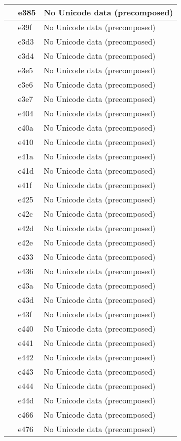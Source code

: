 \documentclass[12pt,letterpaper,openany]{book}
\begin{document}
\begin{center}
\begin{supertabular}{|m{0.25in}|m{0.5in}|m{4in}|}
 & e385 & No Unicode data (precomposed)\\\hline
 & e39f & No Unicode data (precomposed)\\\hline
 & e3d3 & No Unicode data (precomposed)\\\hline
 & e3d4 & No Unicode data (precomposed)\\\hline
 & e3e5 & No Unicode data (precomposed)\\\hline
 & e3e6 & No Unicode data (precomposed)\\\hline
 & e3e7 & No Unicode data (precomposed)\\\hline
 & e404 & No Unicode data (precomposed)\\\hline
 & e40a & No Unicode data (precomposed)\\\hline
 & e410 & No Unicode data (precomposed)\\\hline
 & e41a & No Unicode data (precomposed)\\\hline
 & e41d & No Unicode data (precomposed)\\\hline
 & e41f & No Unicode data (precomposed)\\\hline
 & e425 & No Unicode data (precomposed)\\\hline
 & e42c & No Unicode data (precomposed)\\\hline
 & e42d & No Unicode data (precomposed)\\\hline
 & e42e & No Unicode data (precomposed)\\\hline
 & e433 & No Unicode data (precomposed)\\\hline
 & e436 & No Unicode data (precomposed)\\\hline
 & e43a & No Unicode data (precomposed)\\\hline
 & e43d & No Unicode data (precomposed)\\\hline
 & e43f & No Unicode data (precomposed)\\\hline
 & e440 & No Unicode data (precomposed)\\\hline
 & e441 & No Unicode data (precomposed)\\\hline
 & e442 & No Unicode data (precomposed)\\\hline
 & e443 & No Unicode data (precomposed)\\\hline
 & e444 & No Unicode data (precomposed)\\\hline
 & e44d & No Unicode data (precomposed)\\\hline
 & e466 & No Unicode data (precomposed)\\\hline
 & e476 & No Unicode data (precomposed)\\\hline

\end{supertabular}
\end{center}
\end{document}
